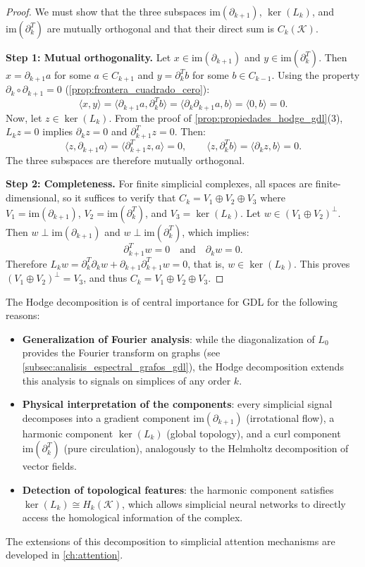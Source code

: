 \begin{proof}
	We must show that the three subspaces $\mathrm{im}(\partial_{k+1})$, $\ker(L_k)$, and $\mathrm{im}(\partial_k^T)$ are mutually orthogonal and that their direct sum is $C_k(\mathcal{K})$.

	\textbf{Step 1: Mutual orthogonality.} Let $x \in \mathrm{im}(\partial_{k+1})$ and $y \in \mathrm{im}(\partial_k^T)$. Then $x = \partial_{k+1} a$ for some $a \in C_{k+1}$ and $y = \partial_k^T b$ for some $b \in C_{k-1}$. Using the property $\partial_k \circ \partial_{k+1} = 0$ (\autoref{prop:frontera_cuadrado_cero}):
	\[
		\langle x, y \rangle = \langle \partial_{k+1} a, \partial_k^T b \rangle = \langle \partial_k \partial_{k+1} a, b \rangle = \langle 0, b \rangle = 0.
	\]
	Now, let $z \in \ker(L_k)$. From the proof of \autoref{prop:propiedades_hodge_gdl}(3), $L_k z = 0$ implies $\partial_k z = 0$ and $\partial_{k+1}^T z = 0$. Then:
	\[
		\langle z, \partial_{k+1} a \rangle = \langle \partial_{k+1}^T z, a \rangle = 0, \qquad
		\langle z, \partial_k^T b \rangle = \langle \partial_k z, b \rangle = 0.
	\]
	The three subspaces are therefore mutually orthogonal.

	\textbf{Step 2: Completeness.} For finite simplicial complexes, all spaces are finite-dimensional, so it suffices to verify that $C_k = V_1 \oplus V_2 \oplus V_3$ where $V_1 = \mathrm{im}(\partial_{k+1})$, $V_2 = \mathrm{im}(\partial_k^T)$, and $V_3 = \ker(L_k)$. Let $w \in (V_1 \oplus V_2)^\perp$. Then $w \perp \mathrm{im}(\partial_{k+1})$ and $w \perp \mathrm{im}(\partial_k^T)$, which implies:
	\[
		\partial_{k+1}^T w = 0 \quad \text{and} \quad \partial_k w = 0.
	\]
	Therefore $L_k w = \partial_k^T \partial_k w + \partial_{k+1} \partial_{k+1}^T w = 0$, that is, $w \in \ker(L_k)$. This proves $(V_1 \oplus V_2)^\perp = V_3$, and thus $C_k = V_1 \oplus V_2 \oplus V_3$.
\end{proof}

The Hodge decomposition is of central importance for \gls{GDL} for the following reasons:
\begin{itemize}
	\item \textbf{Generalization of Fourier analysis}: while the diagonalization of $L_0$ provides the Fourier transform on graphs (see \autoref{subsec:analisis_espectral_grafos_gdl}), the Hodge decomposition extends this analysis to signals on simplices of any order $k$.
	\item \textbf{Physical interpretation of the components}: every simplicial signal decomposes into a gradient component $\mathrm{im}(\partial_{k+1})$ (irrotational flow), a harmonic component $\ker(L_k)$ (global topology), and a curl component $\mathrm{im}(\partial_k^T)$ (pure circulation), analogously to the Helmholtz decomposition of vector fields.
	\item \textbf{Detection of topological features}: the harmonic component satisfies $\ker(L_k) \cong H_k(\mathcal{K})$, which allows simplicial neural networks to directly access the homological information of the complex.
\end{itemize}
The extensions of this decomposition to simplicial attention mechanisms are developed in \autoref{ch:attention}.

